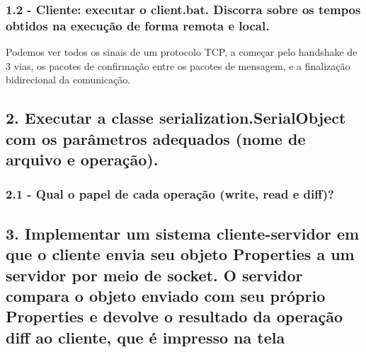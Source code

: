 \subsubsection{1.2 - Cliente: executar o client.bat. Discorra sobre os tempos obtidos na
execução de forma remota e local.}

Podemos ver todos os sinais de um protocolo TCP, a começar pelo handshake de 3 vias, os pacotes de confirmação entre os pacotes de mensagem, e a finalização bidirecional da comunicação.


\subsection*{2. Executar a classe serialization.SerialObject com os parâmetros adequados (nome de arquivo e operação).}

\subsubsection{2.1 - Qual o papel de cada operação (write, read e diff)?}

\subsection*{3. Implementar um sistema cliente-servidor em que o cliente envia seu objeto Properties a um servidor por meio de socket. O servidor compara o objeto enviado com seu próprio Properties e devolve o resultado da operação diff ao cliente, que é impresso na tela}


